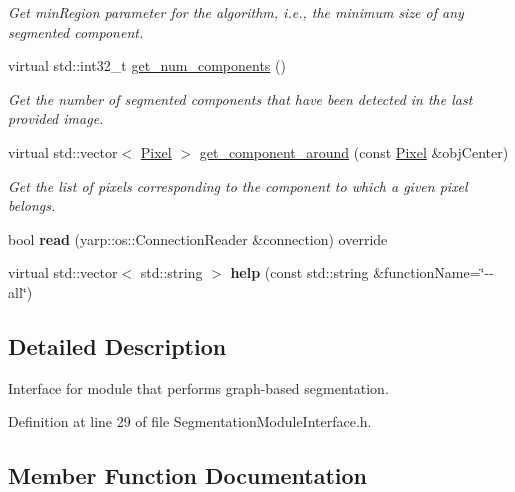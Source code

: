 \begin{DoxyCompactItemize}
\begin{DoxyCompactList}\small\item\em Get min\+Region parameter for the algorithm, i.\+e., the minimum size of any segmented component. \end{DoxyCompactList}\item 
virtual std\+::int32\+\_\+t \mbox{\hyperlink{classyarp_1_1sig_1_1SegmentationModuleInterface_a253cb5a4d4250b97842537b664a93064}{get\+\_\+num\+\_\+components}} ()
\begin{DoxyCompactList}\small\item\em Get the number of segmented components that have been detected in the last provided image. \end{DoxyCompactList}\item 
virtual std\+::vector$<$ \mbox{\hyperlink{classyarp_1_1sig_1_1Pixel}{Pixel}} $>$ \mbox{\hyperlink{classyarp_1_1sig_1_1SegmentationModuleInterface_a9bf0b95fbab216b2284122b0b8a36820}{get\+\_\+component\+\_\+around}} (const \mbox{\hyperlink{classyarp_1_1sig_1_1Pixel}{Pixel}} \&obj\+Center)
\begin{DoxyCompactList}\small\item\em Get the list of pixels corresponding to the component to which a given pixel belongs. \end{DoxyCompactList}\item 
\mbox{\label{classyarp_1_1sig_1_1SegmentationModuleInterface_a31d3ce62c3ad4ab669216a19cde4e769}} 
bool {\bfseries read} (yarp\+::os\+::\+Connection\+Reader \&connection) override
\item 
\mbox{\label{classyarp_1_1sig_1_1SegmentationModuleInterface_a14ea1dff9efc91a5099633740b3e45f9}} 
virtual std\+::vector$<$ std\+::string $>$ {\bfseries help} (const std\+::string \&function\+Name=\char`\"{}-\/-\/all\char`\"{})
\end{DoxyCompactItemize}


\subsection{Detailed Description}
Interface for module that performs graph-\/based segmentation. 

Definition at line 29 of file Segmentation\+Module\+Interface.\+h.



\subsection{Member Function Documentation}
\mbox{\label{classyarp_1_1sig_1_1SegmentationModuleInterface_a9bf0b95fbab216b2284122b0b8a36820}} 
